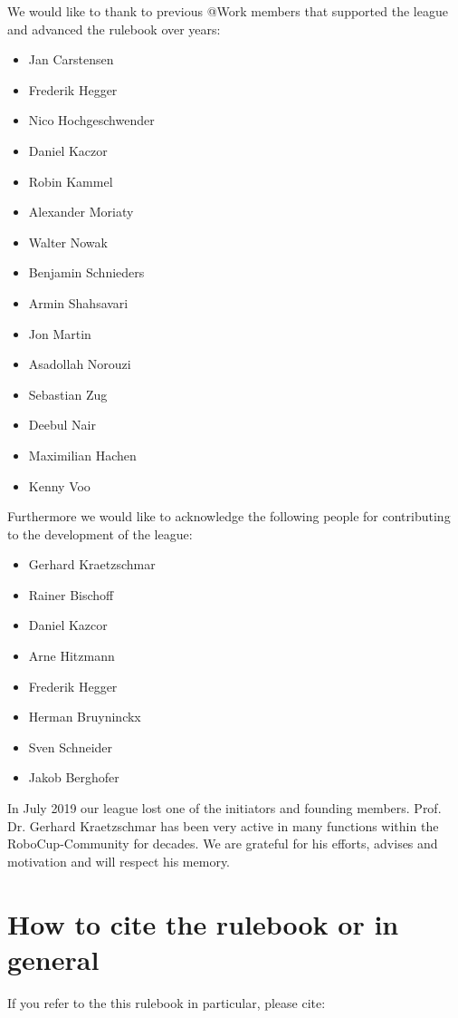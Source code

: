 \begin{titlepage}
We would like to thank to previous @Work members that supported the league and advanced the rulebook over years:
\begin{itemize}
\item Jan Carstensen 
\item Frederik Hegger
\item Nico Hochgeschwender 
\item Daniel Kaczor 
\item Robin Kammel 
\item Alexander Moriaty 
\item Walter Nowak 
\item Benjamin Schnieders
\item Armin Shahsavari 
\item Jon Martin 
\item Asadollah Norouzi
\item Sebastian Zug
\item Deebul Nair
\item Maximilian Hachen
\item Kenny Voo
\end{itemize}


Furthermore we would like to acknowledge the following people for contributing to the development
of the \RCAW league:

\begin{itemize}
	\item Gerhard Kraetzschmar
	\item Rainer Bischoff
	\item Daniel Kazcor
	\item Arne Hitzmann
	\item Frederik Hegger
	\item Herman Bruyninckx
	\item Sven Schneider
	\item Jakob Berghofer
\end{itemize}
In July 2019 our league lost one of the initiators and founding members. Prof. Dr. Gerhard
Kraetzschmar has been very active in many functions within the RoboCup-Community
for decades. We are grateful for his efforts, advises and motivation and will respect his memory.


\begin{minipage}{\textwidth}
\section*{How to cite the rulebook or \RCAW in general}
If you refer to the this rulebook in particular, please cite:


\end{minipage}
\end{titlepage}
